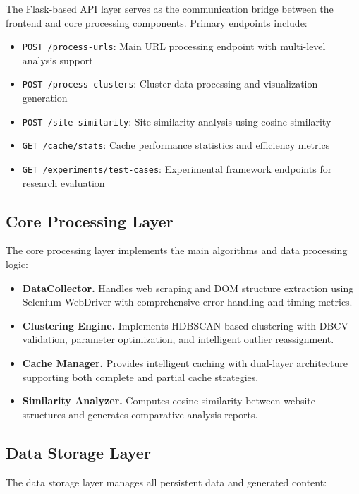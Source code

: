 The Flask-based API layer serves as the communication bridge between the frontend and core processing components. Primary endpoints include:

\begin{itemize}
\item \texttt{POST /process-urls}: Main URL processing endpoint with multi-level analysis support
\item \texttt{POST /process-clusters}: Cluster data processing and visualization generation
\item \texttt{POST /site-similarity}: Site similarity analysis using cosine similarity
\item \texttt{GET /cache/stats}: Cache performance statistics and efficiency metrics
\item \texttt{GET /experiments/test-cases}: Experimental framework endpoints for research evaluation
\end{itemize}

\subsection{Core Processing Layer}

The core processing layer implements the main algorithms and data processing logic:

\begin{itemize}
\item \textbf{DataCollector.} Handles web scraping and DOM structure extraction using Selenium WebDriver with comprehensive error handling and timing metrics.
\item \textbf{Clustering Engine.} Implements HDBSCAN-based clustering with DBCV validation, parameter optimization, and intelligent outlier reassignment.
\item \textbf{Cache Manager.} Provides intelligent caching with dual-layer architecture supporting both complete and partial cache strategies.
\item \textbf{Similarity Analyzer.} Computes cosine similarity between website structures and generates comparative analysis reports.
\end{itemize}

\subsection{Data Storage Layer}

The data storage layer manages all persistent data and generated content:

